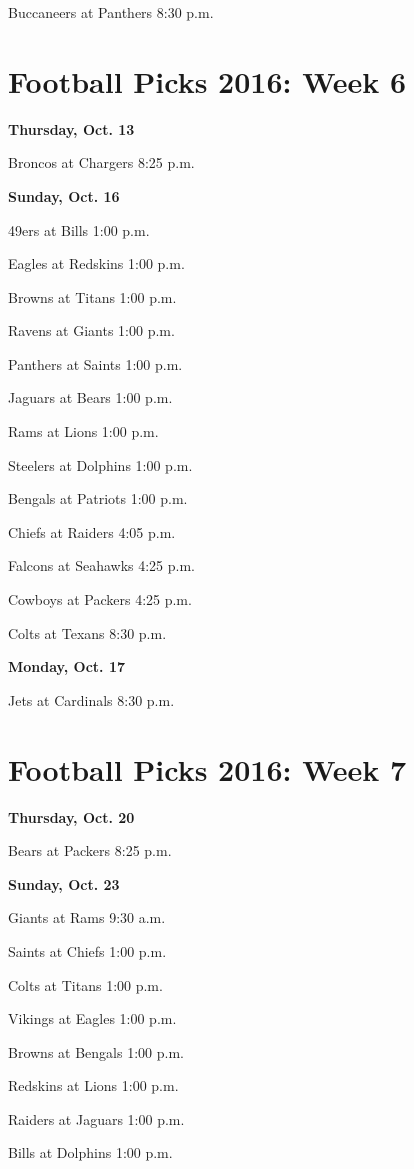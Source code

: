 \documentclass[12pt, letterpaper]{article}
\begin{document}
Buccaneers at Panthers 8:30 p.m.\par
\newpage \section*{\Huge Football Picks 2016: Week 6}
\noindent \Large \textbf{Thursday, Oct. 13} \par
Broncos at Chargers 8:25 p.m.\par
\noindent \Large \textbf{Sunday, Oct. 16} \par
49ers at Bills 1:00 p.m.\par
Eagles at Redskins 1:00 p.m.\par
Browns at Titans 1:00 p.m.\par
Ravens at Giants 1:00 p.m.\par
Panthers at Saints 1:00 p.m.\par
Jaguars at Bears 1:00 p.m.\par
Rams at Lions 1:00 p.m.\par
Steelers at Dolphins 1:00 p.m.\par
Bengals at Patriots 1:00 p.m.\par
Chiefs at Raiders 4:05 p.m.\par
Falcons at Seahawks 4:25 p.m.\par
Cowboys at Packers 4:25 p.m.\par
Colts at Texans 8:30 p.m.\par
\noindent \Large \textbf{Monday, Oct. 17} \par
Jets at Cardinals 8:30 p.m.\par
\newpage \section*{\Huge Football Picks 2016: Week 7}
\noindent \Large \textbf{Thursday, Oct. 20} \par
Bears at Packers 8:25 p.m.\par
\noindent \Large \textbf{Sunday, Oct. 23} \par
Giants at Rams 9:30 a.m.\par
Saints at Chiefs 1:00 p.m.\par
Colts at Titans 1:00 p.m.\par
Vikings at Eagles 1:00 p.m.\par
Browns at Bengals 1:00 p.m.\par
Redskins at Lions 1:00 p.m.\par
Raiders at Jaguars 1:00 p.m.\par
Bills at Dolphins 1:00 p.m.\par
\end{document}
